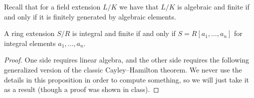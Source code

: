 \documentclass[11pt,a4paper]{article}
\begin{document}
\begin{remark}
  Recall that for a field extension $L/K$ we have that $L/K$
  is algebraic and finite if and only if it is finitely generated
  by algebraic elements.
\end{remark}

\begin{proposition}
  \label{prop:integral-finite-iff-finitely-generated}
  A ring extension $S/R$ is integral and finite if and only if
  $S = R[a_1,\dots,a_n]$ for integral elements $a_1,\dots,a_n$.
\end{proposition}
\begin{proof}
  One side requires linear algebra,
  and the other side requires the following
  generalized version of the classic Cayley--Hamilton
  theorem.
  We never use the details in this proposition in order
  to compute something, so we will just take it as
  a result (though a proof was shown in class).
\end{proof}
\end{document}
